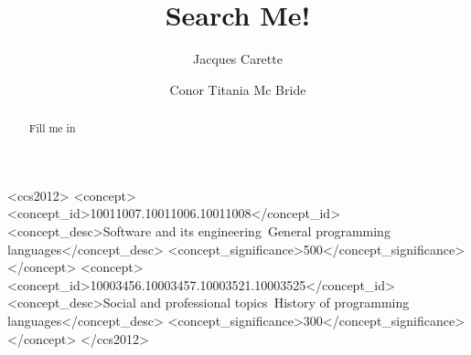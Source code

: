 \documentclass[acmsmall,review,prologue,dvipsnames,bookmarks=false]{acmart}
\begin{document}
\title{Search Me!}

\author{Jacques Carette}
\author{Conor Titania Mc Bride}

\acmDOI{} %




\begin{CCSXML}
<ccs2012>
<concept>
<concept_id>10011007.10011006.10011008</concept_id>
<concept_desc>Software and its engineering~General programming languages</concept_desc>
<concept_significance>500</concept_significance>
</concept>
<concept>
<concept_id>10003456.10003457.10003521.10003525</concept_id>
<concept_desc>Social and professional topics~History of programming languages</concept_desc>
<concept_significance>300</concept_significance>
</concept>
</ccs2012>
\end{CCSXML}



\begin{abstract}
Fill me in
\end{abstract}

\maketitle
\end{document}
